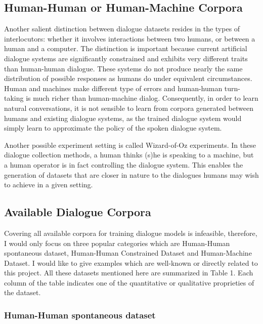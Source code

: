 \documentclass[bsc,frontabs,twoside,singlespacing,parskip,deptreport]{infthesis}     %
\begin{document}
\subsection{Human-Human or Human-Machine Corpora}

Another salient distinction between dialogue datasets resides in the types of interlocutors: whether it involves interactions between two humans, or between a human and a computer. The distinction is important because current artificial dialogue systems are significantly constrained and exhibits very different traits than human-human dialogue\cite{doran2003comparing}. These systems do not produce nearly the same distribution of possible responses as humans do under equivalent circumstances. Human and machines make different type of errors and human-human turn-taking is much richer than human-machine dialog\cite{williams2007partially}. Consequently, in order to learn natural conversations, it is not sensible to learn from corpora generated between humans and existing dialogue systems, as the trained dialogue system would simply learn to approximate the policy of the spoken dialogue system.

Another possible experiment setting is called Wizard-of-Oz experiments\cite{bohus2008sorry,petrik2004wizard,budzianowski2018multiwoz,eric2019multiwoz}. In these dialogue collection methods, a human thinks (s)he is speaking to a machine, but a human operator is in fact controlling the dialogue system. This enables the generation of datasets that are closer in nature to the dialogues humans may wish to achieve in a given setting. 




\subsection{Available Dialogue Corpora}

Covering all available corpora for training dialogue models is infeasible, therefore, I would only focus on three popular categories which are Human-Human spontaneous dataset, Human-Human Constrained Dataset and Human-Machine Dataset. I would like to give examples which are well-known or directly related to this project. All these datasets mentioned here are summarized in Table 1. Each column of the table indicates one of the quantitative or qualitative proprieties of the dataset.


\subsubsection{Human-Human spontaneous dataset}
\end{document}
